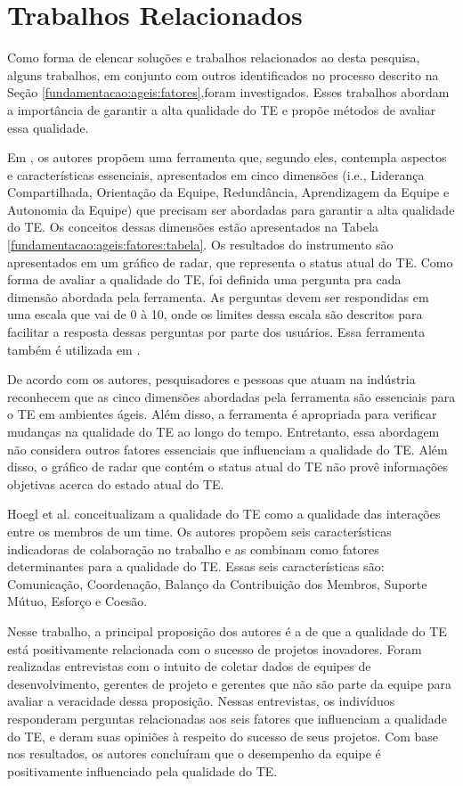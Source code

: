 \chapter{Trabalhos Relacionados}
\label{trabalhos}

Como forma de elencar soluções e trabalhos relacionados ao desta pesquisa, alguns trabalhos, em conjunto com outros identificados no processo descrito na Seção \ref{fundamentacao:ageis:fatores},foram investigados. Esses trabalhos abordam a importância de garantir a alta qualidade do TE e propõe métodos de avaliar essa qualidade.

Em \cite{moe}, os autores propõem uma ferramenta que, segundo eles, contempla aspectos e características essenciais, apresentados em cinco dimensões (i.e., Liderança Compartilhada, Orientação da Equipe, Redundância, Aprendizagem da Equipe e Autonomia da Equipe) que precisam ser abordadas para garantir a alta qualidade do TE. Os conceitos dessas dimensões estão apresentados na Tabela \ref{fundamentacao:ageis:fatores:tabela}. Os resultados do instrumento são apresentados em um gráfico de radar, que representa o status atual do TE. Como forma de avaliar a qualidade do TE, foi definida uma pergunta pra cada dimensão abordada pela ferramenta. As perguntas devem ser respondidas em uma escala que vai de 0 à 10, onde os limites dessa escala são descritos para facilitar a resposta dessas perguntas por parte dos usuários. Essa ferramenta também é utilizada em \cite{ringstad}.

De acordo com os autores, pesquisadores e pessoas que atuam na indústria reconhecem que as cinco dimensões abordadas pela ferramenta são essenciais para o TE em ambientes ágeis. Além disso, a ferramenta é apropriada para verificar mudanças na qualidade do TE ao longo do tempo. Entretanto, essa abordagem não considera outros fatores essenciais que influenciam a qualidade do TE. Além disso, o gráfico de radar que contém o status atual do TE não provê informações objetivas acerca do estado atual do TE.

Hoegl et al. \cite{hoegl} conceitualizam a qualidade do TE como a qualidade das interações entre os membros de um time. Os autores propõem seis características indicadoras de colaboração no trabalho e as combinam como fatores determinantes para a qualidade do TE. Essas seis características são: Comunicação, Coordenação, Balanço da Contribuição dos Membros, Suporte Mútuo, Esforço e Coesão.

Nesse trabalho, a principal proposição dos autores é a de que a qualidade do TE está positivamente relacionada com o sucesso de projetos inovadores. Foram realizadas entrevistas com o intuito de coletar dados de equipes de desenvolvimento, gerentes de projeto e gerentes que não são parte da equipe para avaliar a veracidade dessa proposição. Nessas entrevistas, os indivíduos responderam perguntas relacionadas aos seis fatores que influenciam a qualidade do TE, e deram suas opiniões à respeito do sucesso de seus projetos. Com base nos resultados, os autores concluíram que o desempenho da equipe é positivamente influenciado pela qualidade do TE.

